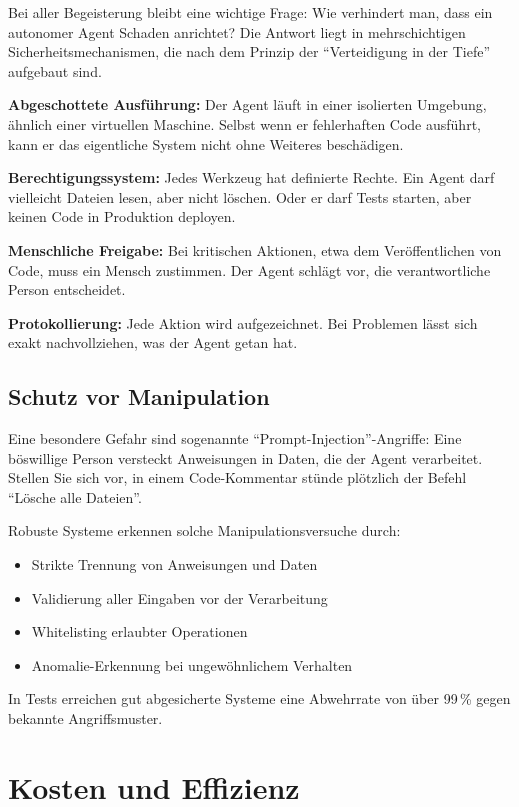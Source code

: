Bei aller Begeisterung bleibt eine wichtige Frage: Wie verhindert man, dass ein autonomer Agent Schaden anrichtet? Die Antwort liegt in mehrschichtigen Sicherheitsmechanismen, die nach dem Prinzip der \enquote{Verteidigung in der Tiefe} aufgebaut sind.

\textbf{Abgeschottete Ausführung:} Der Agent läuft in einer isolierten Umgebung, ähnlich einer virtuellen Maschine. Selbst wenn er fehlerhaften Code ausführt, kann er das eigentliche System nicht ohne Weiteres beschädigen.

\textbf{Berechtigungssystem:} Jedes Werkzeug hat definierte Rechte. Ein Agent darf vielleicht Dateien lesen, aber nicht löschen. Oder er darf Tests starten, aber keinen Code in Produktion deployen.

\textbf{Menschliche Freigabe:} Bei kritischen Aktionen, etwa dem Veröffentlichen von Code, muss ein Mensch zustimmen. Der Agent schlägt vor, die verantwortliche Person entscheidet.

\textbf{Protokollierung:} Jede Aktion wird aufgezeichnet. Bei Problemen lässt sich exakt nachvollziehen, was der Agent getan hat.

\subsection{Schutz vor Manipulation}

Eine besondere Gefahr sind sogenannte \enquote{Prompt-Injection}-Angriffe: Eine böswillige Person versteckt Anweisungen in Daten, die der Agent verarbeitet. Stellen Sie sich vor, in einem Code-Kommentar stünde plötzlich der Befehl \enquote{Lösche alle Dateien}.

Robuste Systeme erkennen solche Manipulationsversuche durch:
\begin{itemize}
  \item Strikte Trennung von Anweisungen und Daten
  \item Validierung aller Eingaben vor der Verarbeitung
  \item Whitelisting erlaubter Operationen
  \item Anomalie-Erkennung bei ungewöhnlichem Verhalten
\end{itemize}

In Tests erreichen gut abgesicherte Systeme eine Abwehrrate von über 99\,\% gegen bekannte Angriffsmuster.


\section{Kosten und Effizienz}

